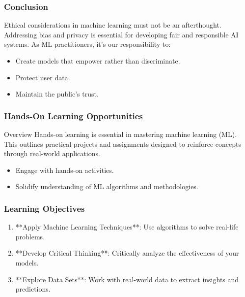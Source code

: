 \documentclass[aspectratio=169]{beamer}
\begin{document}
\begin{frame}[fragile]
    \frametitle{Conclusion}
    Ethical considerations in machine learning must not be an afterthought. Addressing bias and privacy is essential for developing fair and responsible AI systems. As ML practitioners, it's our responsibility to:
    \begin{itemize}
        \item Create models that empower rather than discriminate.
        \item Protect user data.
        \item Maintain the public's trust.
    \end{itemize}
\end{frame}

\begin{frame}
    \frametitle{Hands-On Learning Opportunities}
    \begin{block}{Overview}
        Hands-on learning is essential in mastering machine learning (ML). This outlines practical projects and assignments designed to reinforce concepts through real-world applications.
    \end{block}
    
    \begin{itemize}
        \item Engage with hands-on activities.
        \item Solidify understanding of ML algorithms and methodologies.
    \end{itemize}
\end{frame}

\begin{frame}
    \frametitle{Learning Objectives}
    \begin{enumerate}
        \item **Apply Machine Learning Techniques**: Use algorithms to solve real-life problems.
        \item **Develop Critical Thinking**: Critically analyze the effectiveness of your models.
        \item **Explore Data Sets**: Work with real-world data to extract insights and predictions.
    \end{enumerate}
\end{frame}
\end{document}
